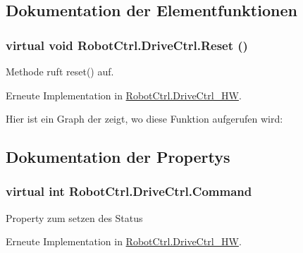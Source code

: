 \subsection{Dokumentation der Elementfunktionen}
\hypertarget{class_robot_ctrl_1_1_drive_ctrl_a721795047bfe5d2cca3fab6eeb0ab905}{
\subsubsection[{Reset}]{\setlength{\rightskip}{0pt plus 5cm}virtual void RobotCtrl.DriveCtrl.Reset ()}}
\label{class_robot_ctrl_1_1_drive_ctrl_a721795047bfe5d2cca3fab6eeb0ab905}
Methode ruft reset() auf. 

Erneute Implementation in \hyperlink{class_robot_ctrl_1_1_drive_ctrl___h_w_a30785a704b5385ea9c41ad87ebb8f61f}{RobotCtrl.DriveCtrl\_\-HW}.



Hier ist ein Graph der zeigt, wo diese Funktion aufgerufen wird:



\subsection{Dokumentation der Propertys}
\hypertarget{class_robot_ctrl_1_1_drive_ctrl_a45359565bdcb6293ed723acb48cae18b}{
\subsubsection[{Command}]{\setlength{\rightskip}{0pt plus 5cm}virtual int RobotCtrl.DriveCtrl.Command}}
\label{class_robot_ctrl_1_1_drive_ctrl_a45359565bdcb6293ed723acb48cae18b}
Property zum setzen des Status 

Erneute Implementation in \hyperlink{class_robot_ctrl_1_1_drive_ctrl___h_w_acc8cbfa5af4849ee85babc540ad63ada}{RobotCtrl.DriveCtrl\_\-HW}.

